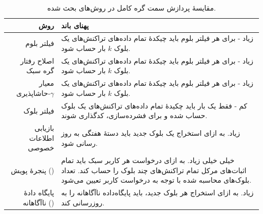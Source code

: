 \begin{xltabular}{\textwidth}{|r|X|}
	\caption{
		مقایسهٔ پردازش سمت گره کامل در روش‌های بحث شده.
		\label{table:ProcCmp}}\\
	\hline
	\textbf{روش} & \textbf{پهنای باند} \\
	\hline 
	{%
		فیلتر بلوم \cite{Hearn2013}
	} & {%
		زیاد - برای هر فیلتر بلوم باید چیکدهٔ تمام داده‌های تراکنش‌های یک بلوک $k$ بار حساب شود. 
	} \\
	\hline
	{%
		اصلاح رفتار گره سبک \cite{Gervais2014}
	} & {%
		زیاد - برای هر فیلتر بلوم باید چیکدهٔ تمام داده‌های تراکنش‌های یک بلوک $k$ بار حساب شود.
	}\\
	\hline
	{%
		معیار حاشاپذیری-$\gamma$ \cite{Kanemura2017}
	} & {%
		زیاد - برای هر فیلتر بلوم باید چیکدهٔ تمام داده‌های تراکنش‌های یک بلوک $k$ بار حساب شود.
	}\\
	\hline
	{%
		فیلتر بلوک \cite{Osuntokun2017}
	} & {%
		کم - فقط یک بار باید چکیدهٔ تمام داده‌های تراکنش‌های یک بلوک حساب شده و برای فشرده‌سازی، کدگذاری شوند.
	}\\
	\hline
	{%
		بازیابی اطلاعات خصوصی \cite{Qin2019}
	} & {%
		زیاد. به ازای استخراج یک بلوک جدید باید دستهٔ هفتگی به روز رسانی شود.
	}\\
	\hline
	{%
		پنجرهٔ پویش () \cite{Matetic2019}
	} & {%
		خیلی خیلی زیاد. به ازای درخواست هر کاربر سبک باید تمام اثبات‌های مرکل تمام تراکنش‌های چند بلوک را حساب کند. تعداد بلوک‌های محاسبه شده با توجه به درخواست کاربر تعیین می‌شود.
	}\\
	\hline
	{%
		پایگاه دادهٔ ناآگاهانه () \cite{Matetic2019}
	} & {%
		زیاد. به ازای استخراج هر بلوک جدید، باید پایگاه‌داده ناآگاهانه را به روزرسانی کند.
	}\\
	\hline	
\end{xltabular}